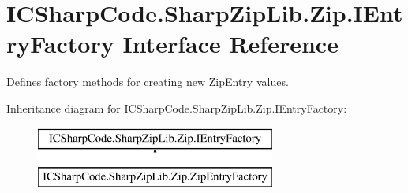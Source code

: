 \hypertarget{interface_i_c_sharp_code_1_1_sharp_zip_lib_1_1_zip_1_1_i_entry_factory}{}\section{I\+C\+Sharp\+Code.\+Sharp\+Zip\+Lib.\+Zip.\+I\+Entry\+Factory Interface Reference}
\label{interface_i_c_sharp_code_1_1_sharp_zip_lib_1_1_zip_1_1_i_entry_factory}


Defines factory methods for creating new \hyperlink{class_i_c_sharp_code_1_1_sharp_zip_lib_1_1_zip_1_1_zip_entry}{Zip\+Entry} values.  


Inheritance diagram for I\+C\+Sharp\+Code.\+Sharp\+Zip\+Lib.\+Zip.\+I\+Entry\+Factory\+:\begin{figure}[H]
\begin{center}
\leavevmode
\includegraphics[height=2.000000cm]{interface_i_c_sharp_code_1_1_sharp_zip_lib_1_1_zip_1_1_i_entry_factory}
\end{center}
\end{figure}
